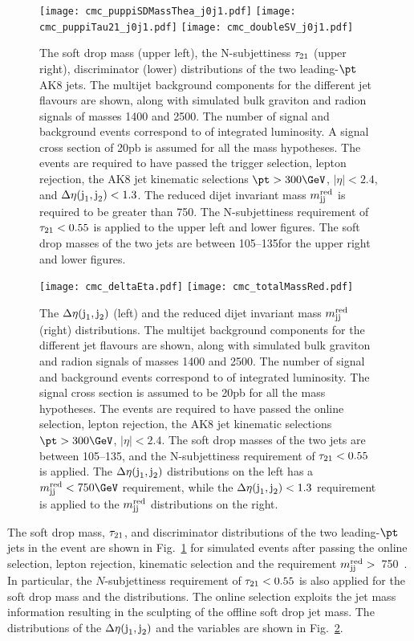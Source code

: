 \begin{figure}[h]
\centering
\texttt{[image: cmc\_puppiSDMassThea\_j0j1.pdf]}
\texttt{[image: cmc\_puppiTau21\_j0j1.pdf]}
\texttt{[image: cmc\_doubleSV\_j0j1.pdf]}
\caption{The soft drop mass (upper left), the N-subjettiness $\tau_{21}$
  (upper right), \Hbbt discriminator (lower) distributions of the two leading-$\pt$ AK8
  jets. The multijet background components for the different jet
  flavours are shown, along with simulated bulk graviton and radion signals of
  masses 1400 and 2500\GeV. The number of signal and background
  events correspond to \intLumi of integrated luminosity. A signal
  cross section of 20\unit{pb} is assumed for all the mass
  hypotheses. The events are required to have passed the trigger
  selection, lepton rejection, the AK8 jet kinematic selections $\pt >
  300\GeV$, $|\eta| < 2.4$, and $\Delta\eta(\text{j}_{1}, \text{j}_{2}) < 1.3$. The reduced dijet
  invariant mass $m_{\text{jj}}^{\text{red}}$ is required to be greater than 750\GeV. The
  N-subjettiness requirement of $\tau_{21} < 0.55$ is applied to the upper
  left and lower figures. The soft drop masses of the two jets
  are between 105--135\GeV for the upper right and lower
  figures.\label{fig:uncorrsd_prebtag}}
\end{figure}

\begin{figure}[h]
\centering
\texttt{[image: cmc\_deltaEta.pdf]}
\texttt{[image: cmc\_totalMassRed.pdf]}
\caption{The $\Delta\eta(\text{j}_{1}, \text{j}_{2})$ (left) and the reduced dijet
  invariant mass $m_{\text{jj}}^{\text{red}}$ (right) distributions. The multijet background components
  for the different jet flavours are shown, along with simulated bulk
  graviton and radion signals of masses 1400 and 2500\GeV. The number of signal
  and background events correspond to \intLumi of integrated
  luminosity. The signal cross section is assumed to be 20\unit{pb}
  for all the mass hypotheses. The events are required to have passed
  the online selection, lepton rejection, the AK8 jet kinematic
  selections $\pt > 300\GeV$, $|\eta| < 2.4$. The soft drop masses of
  the two jets are between 105--135\GeV, and the N-subjettiness
  requirement of $\tau_{21} < 0.55$ is applied. The $\Delta\eta(\text{j}_{1}, \text{j}_{2})$
  distributions on the left has a $\mjjs < 750\GeV$ requirement, while
  the $\Delta\eta(\text{j}_{1}, \text{j}_{2}) < 1.3$ requirement is applied to the $m_{\text{jj}}^{\text{red}}$
  distributions on the right.}
\label{fig:deta_mjjred_prebtag}
\end{figure}

The soft drop mass, $\tau_{21}$, and \Hbbt discriminator
distributions of the two leading-$\pt$ jets in the event are shown in
Fig.~\ref{fig:uncorrsd_prebtag} for simulated events after passing the
online selection, lepton rejection, kinematic selection and the
requirement $m_{\text{jj}}^{\text{red}} >$~750~\GeV.
In particular, the $N$-subjettiness requirement of $\tau_{21}
< 0.55$ is also applied for the soft drop mass and the \Hbbt
distributions. The online selection exploits the jet mass information
resulting in the sculpting of the offline soft drop jet mass.
The distributions of the $\Delta\eta(\text{j}_{1}, \text{j}_{2})$ and the
\mjjred variables are shown in Fig.~\ref{fig:deta_mjjred_prebtag}.

